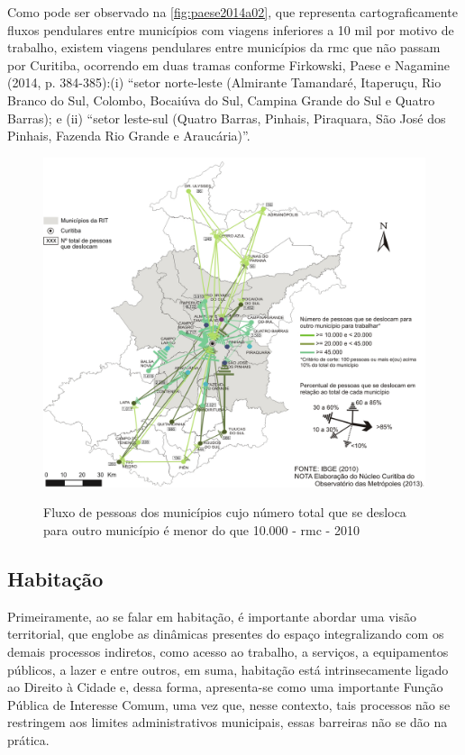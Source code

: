 	Como pode ser observado na \autoref{fig:paese2014a02}, que representa cartograficamente fluxos pendulares entre municípios com viagens inferiores a 10 mil por motivo de trabalho, existem viagens pendulares entre municípios da \gls{rmc} que não passam por Curitiba, ocorrendo em duas tramas conforme Firkowski, Paese e Nagamine (2014, p. 384-385):(i) “setor norte-leste (Almirante Tamandaré, Itaperuçu, Rio Branco do Sul, Colombo, Bocaiúva do Sul, Campina Grande do Sul e Quatro Barras); e (ii) ``setor leste-sul (Quatro Barras, Pinhais, Piraquara, São José dos Pinhais, Fazenda Rio Grande e Araucária)''.

	\begin{figure}
		\centering
		\caption{Fluxo de pessoas dos municípios cujo número total que se desloca para outro município é menor do que 10.000 - \gls{rmc} - 2010}
		\includegraphics[width=0.7\linewidth]{img/paese2014a_02}
		\label{fig:paese2014a02}
	\end{figure}
	
	\subsection{Habitação}
	Primeiramente, ao se falar em habitação, é importante abordar uma visão territorial, que englobe as dinâmicas presentes do espaço integralizando com os demais processos indiretos, como acesso ao trabalho, a serviços, a equipamentos públicos, a lazer e entre outros, em suma, habitação está intrinsecamente ligado ao Direito à Cidade \cite[p. 14]{vaccari2018a} e, dessa forma, apresenta-se como uma importante Função Pública de Interesse Comum, uma vez que, nesse contexto, tais processos não se restringem aos limites administrativos municipais, essas barreiras não se dão na prática. 
	
